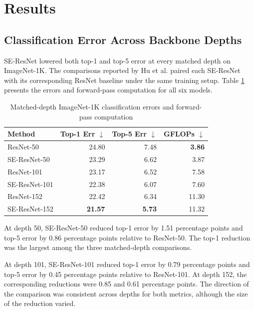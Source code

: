\section{Results}

\subsection{Classification Error Across Backbone Depths}

SE-ResNet lowered both top-1 and top-5 error at every matched depth on ImageNet-1K. The comparisons reported by Hu et al. \cite{hu2018squeeze} paired each SE-ResNet with its corresponding ResNet baseline \cite{he2016resnet} under the same training setup. Table \ref{tab:x-d526b8} presents the errors and forward-pass computation for all six models.

\begin{table}[t]
\centering
\caption{Matched-depth ImageNet-1K classification errors and forward-pass computation}
\label{tab:x-d526b8}
\begin{tabular}{lrrr}
\toprule
Method & Top-1 Err $\downarrow$ & Top-5 Err $\downarrow$ & GFLOPs $\downarrow$ \\
\midrule
ResNet-50 & 24.80 & 7.48 & \textbf{3.86} \\
SE-ResNet-50 & 23.29 & 6.62 & 3.87 \\
ResNet-101 & 23.17 & 6.52 & 7.58 \\
SE-ResNet-101 & 22.38 & 6.07 & 7.60 \\
ResNet-152 & 22.42 & 6.34 & 11.30 \\
SE-ResNet-152 & \textbf{21.57} & \textbf{5.73} & 11.32 \\
\bottomrule
\end{tabular}
\par{}
\end{table}

At depth 50, SE-ResNet-50 reduced top-1 error by 1.51 percentage points and top-5 error by 0.86 percentage points relative to ResNet-50. The top-1 reduction was the largest among the three matched-depth comparisons.

At depth 101, SE-ResNet-101 reduced top-1 error by 0.79 percentage points and top-5 error by 0.45 percentage points relative to ResNet-101. At depth 152, the corresponding reductions were 0.85 and 0.61 percentage points. The direction of the comparison was consistent across depths for both metrics, although the size of the reduction varied.

